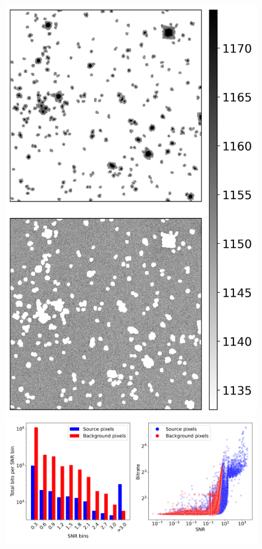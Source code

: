 \begin{figure}[ht]
    \centering
    \begin{minipage}{.2\textwidth}
        \includegraphics[width=1\textwidth]{figs/combined_images_with_aligned_colorbar.png}
        \end{minipage}
    \hfill
    \begin{minipage}{.74\textwidth}
        \includegraphics[width=1\textwidth]{figs/histo_and_scatter.png}

\end{minipage}
\end{figure}
